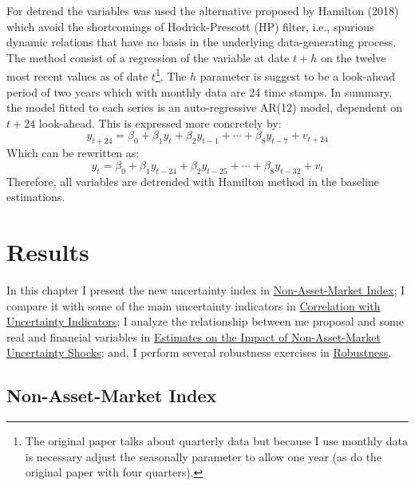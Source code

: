 \documentclass[12pt,twoside]{reedthesis}
\begin{document}
For detrend the variables was used the alternative proposed by Hamilton (2018) which avoid the shortcomings of Hodrick-Prescott (HP) filter, i.e., spurious dynamic relations that have no basis in the underlying data-generating process. The method consist of a regression of the variable at date \(t + h\) on the twelve most recent values as of date \(t\)\footnote{The original paper talks about quarterly data but because I use monthly data is necessary adjust the seasonally parameter to allow one year (as do the original paper with four quarters).}. The \(h\) parameter is suggest to be a look-ahead period of two years which with monthly data are 24 time stamps. In summary, the model fitted to each series is an auto-regressive AR(12) model, dependent on \(t + 24\) look-ahead. This is expressed more concretely by:
\begin{equation}
  y_{t+24} = \beta_{0} + \beta_{1}y_{t} + \beta_{2}y_{t - 1} + \cdots + \beta_{8}y_{t - 7} + v_{t + 24}
  \label{eq:hamilton-basic}
\end{equation}
Which can be rewritten as:
\begin{equation}
  y_{t} = \beta_{0} + \beta_{1}y_{t - 24} + \beta_{2}y_{t - 25} + \cdots + \beta_{8}y_{t - 32} + v_{t}
  \label{eq:hamilton-final}
\end{equation}
Therefore, all variables are detrended with Hamilton method in the baseline estimations.

\hypertarget{results}{%
\chapter{Results}\label{results}}

In this chapter I present the new uncertainty index in \protect\hyperlink{non-asset-market-index}{Non-Asset-Market Index}; I compare it with some of the main uncertainty indicators in \protect\hyperlink{correlatio-with-uncertainty-indicators}{Correlation with Uncertainty Indicators}; I analyze the relationship between me proposal and some real and financial variables in \protect\hyperlink{var-baseline}{Estimates on the Impact of Non-Asset-Market Uncertainty Shocks}; and, I perform several robustness exercises in \protect\hyperlink{robustness}{Robustness}.

\hypertarget{non-asset-market-index}{%
\section{Non-Asset-Market Index}\label{non-asset-market-index}}
\end{document}
